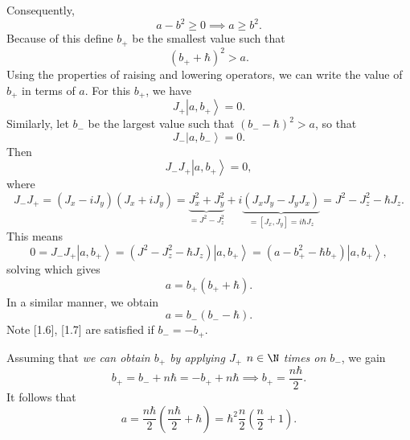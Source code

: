 \documentclass[phys334]{subfiles}
\begin{document}
    \np Consequently,
    \begin{equation*}
        a-b^{2}\geq 0 \implies a\geq b^{2}.
    \end{equation*}
    Because of this define $b_{+}$ be the smallest value such that
    \begin{equation*}
        \left( b_{+}+\hbar \right)^{2}>a.
    \end{equation*}
    Using the properties of raising and lowering operators, we can write the value of $b_{+}$ in terms of $a$. For this $b_{+}$, we have
    \begin{equation*}
        J_+\left| a,b_{+} \right\rangle = 0.
    \end{equation*}
    Similarly, let $b_{-}$ be the largest value such that $\left( b_--\hbar \right)^{2}>a$, so that
    \begin{equation*}
        J_-\left| a,b_{-} \right\rangle = 0.
    \end{equation*}
    Then
    \begin{equation*}
        J_-J_+\left| a,b_{+} \right\rangle = 0,
    \end{equation*}
    where
    \begin{equation*}
        J_-J_+ = \left( J_x-iJ_y \right)\left( J_x+iJ_y \right) = \underbrace{J_x^{2}+J_y^{2}}_{=J^{2}-J_z^{2}}+i\underbrace{\left( J_xJ_y-J_yJ_x \right)}_{=\left[ J_x,J_y \right]=i\hbar J_z} = J^{2}-J_z^{2}-\hbar J_z.
    \end{equation*}
    This means
    \begin{equation*}
        0 = J_-J_+\left| a,b_{+} \right\rangle = \left( J^{2}-J_z^{2}-\hbar J_z \right)\left| a,b_+ \right\rangle = \left( a-b_+^{2}-\hbar b_+ \right)\left| a,b_+ \right\rangle,
    \end{equation*}
    solving which gives
    \begin{equation}
        a = b_+\left( b_++\hbar \right).
    \end{equation}
    In a similar manner, we obtain
    \begin{equation}
        a = b_-\left( b_--\hbar \right).
    \end{equation}
    Note [1.6], [1.7] are satisfied if $b_- = -b_+$.

    Assuming that \textit{we can obtain $b_+$ by applying $J_+$ $n\in\N$ times on $b_-$}, we gain
    \begin{equation*}
        b_+ = b_-+n\hbar = -b_++n\hbar \implies b_+ = \frac{n\hbar}{2}.
    \end{equation*}
    It follows that
    \begin{equation}
        a = \frac{n\hbar}{2}\left( \frac{n\hbar}{2}+\hbar \right) = \hbar^{2} \frac{n}{2} \left( \frac{n}{2}+1 \right).
    \end{equation}
\end{document}
